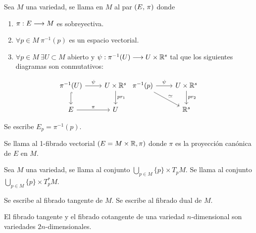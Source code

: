 \begin{definition}
  Sea $M$ una variedad, se llama  en $M$ al par $(E,\thinspace \pi)$ donde
  \begin{enumerate}
    \item $\pi:E\longrightarrow M$ es sobreyectiva.
    \item $\forall p\in M\ \pi^{-1}(p)$ es un espacio vectorial.
    \item $\forall p\in M\ \exists U\subset M$ abierto y $\psi:\pi^{-1}(U)\longrightarrow U\times\mathbb{R}^s$ tal que los siguientes diagramas son conmutativos:
  \end{enumerate}


  \[
    \begin{tikzcd}
      \pi^{-1}(U)\arrow{r}{\psi}\arrow[hook]{d} & U\times\R^s\arrow{d}{pr_1}\\
      E\arrow{r}{\pi} & U
    \end{tikzcd}
    \begin{tikzcd}
      \pi^{-1}(p)\arrow{r}{\psi}\arrow{dr}{\simeq} & U\times\R^s\arrow{d}{pr_2}\\
       & \R^s
    \end{tikzcd}
  \]
\end{definition}
\begin{notation}
  Se escribe $E_p=\pi^{-1}(p)$.
\end{notation}

\begin{definition}
Se llama  al 1-fibrado vectorial $(E=M\times\mathbb{R},\pi)$ donde
$\pi$
es la proyección canónica de $E$ en $M$.
\end{definition}

\begin{definition}
  Sea $M$ una variedad, se llama  al conjunto $\bigcup_{p\in M}\{p\}\times T_pM$.
  Se llama  al conjunto $\bigcup_{p\in M}\{p\}\times T^*_pM$.
\end{definition}
\begin{notation}
  Se escribe  al fibrado tangente de $M$.
  Se escribe  al fibrado dual de $M$.
\end{notation}

\begin{exercise}
  El fibrado tangente y el fibrado cotangente de una variedad $n$-dimensional son variedades $2n$-dimensionales.
\end{exercise}

